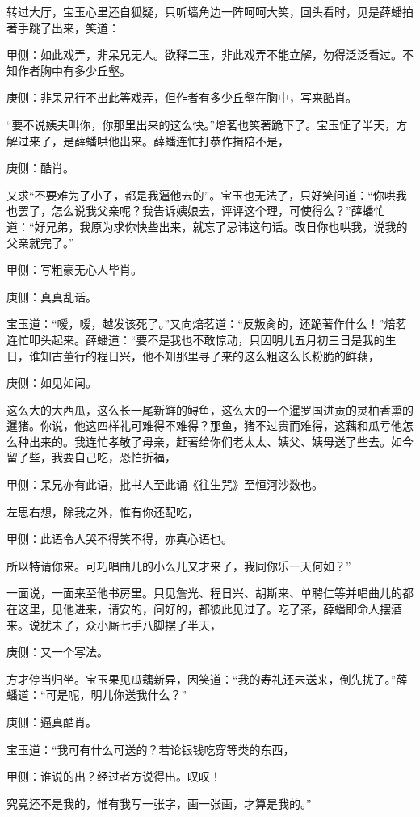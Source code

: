 \begin{parag}
    转过大厅，宝玉心里还自狐疑，只听墙角边一阵呵呵大笑，回头看时，见是薛蟠拍著手跳了出来，笑道：\begin{note}甲侧：如此戏弄，非呆兄无人。欲释二玉，非此戏弄不能立解，勿得泛泛看过。不知作者胸中有多少丘壑。\end{note}\begin{note}庚侧：非呆兄行不出此等戏弄，但作者有多少丘壑在胸中，写来酷肖。\end{note}“要不说姨夫叫你，你那里出来的这么快。”焙茗也笑著跪下了。宝玉怔了半天，方解过来了，是薛蟠哄他出来。薛蟠连忙打恭作揖陪不是，\begin{note}庚侧：酷肖。\end{note}又求“不要难为了小子，都是我逼他去的”。宝玉也无法了，只好笑问道：“你哄我也罢了，怎么说我父亲呢？我告诉姨娘去，评评这个理，可使得么？”薛蟠忙道：“好兄弟，我原为求你快些出来，就忘了忌讳这句话。改日你也哄我，说我的父亲就完了。”\begin{note}甲侧：写粗豪无心人毕肖。\end{note}\begin{note}庚侧：真真乱话。\end{note}宝玉道：“嗳，嗳，越发该死了。”又向焙茗道：“反叛肏的，还跪著作什么！”焙茗连忙叩头起来。薛蟠道：“要不是我也不敢惊动，只因明儿五月初三日是我的生日，谁知古董行的程日兴，他不知那里寻了来的这么粗这么长粉脆的鲜藕，\begin{note}庚侧：如见如闻。\end{note}这么大的大西瓜，这么长一尾新鲜的鲟鱼，这么大的一个暹罗国进贡的灵柏香熏的暹猪。你说，他这四样礼可难得不难得？那鱼，猪不过贵而难得，这藕和瓜亏他怎么种出来的。我连忙孝敬了母亲，赶著给你们老太太、姨父、姨母送了些去。如今留了些，我要自己吃，恐怕折福，\begin{note}甲侧：呆兄亦有此语，批书人至此诵《往生咒》至恒河沙数也。\end{note}左思右想，除我之外，惟有你还配吃，\begin{note}甲侧：此语令人哭不得笑不得，亦真心语也。\end{note}所以特请你来。可巧唱曲儿的小么儿又才来了，我同你乐一天何如？”
\end{parag}


\begin{parag}
    一面说，一面来至他书房里。只见詹光、程日兴、胡斯来、单聘仁等并唱曲儿的都在这里，见他进来，请安的，问好的，都彼此见过了。吃了茶，薛蟠即命人摆酒来。说犹未了，众小厮七手八脚摆了半天，\begin{note}庚侧：又一个写法。\end{note}方才停当归坐。宝玉果见瓜藕新异，因笑道：“我的寿礼还未送来，倒先扰了。”薛蟠道：“可是呢，明儿你送我什么？”\begin{note}庚侧：逼真酷肖。\end{note}宝玉道：“我可有什么可送的？若论银钱吃穿等类的东西，\begin{note}甲侧：谁说的出？经过者方说得出。叹叹！\end{note}究竟还不是我的，惟有我写一张字，画一张画，才算是我的。”
\end{parag}


